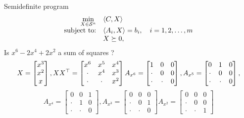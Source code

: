 \begin{frame}{Semidefinite program}
      \begin{equation*}
        \label{eq:sdp_standard}
        \begin{array}{rl}
          \min\limits_{X \in \mathcal{S}^n} & \langle C, X \rangle\\
          \text{subject to:} & \langle A_i, X \rangle = b_i, \quad i=1,2,\ldots,m\\
          & X \succeq 0,
        \end{array}
      \end{equation*}
      Is $x^6 - 2x^4 + 2x^2$ a sum of squares ?
      $$
      X =
      \begin{bmatrix}
        x^3\\
        x^2\\
        x
      \end{bmatrix},
      XX^\top =
      \begin{bmatrix}
        x^6 & x^5 & x^4\\
        \cdot & x^4 & x^3\\
        \cdot & \cdot & x^2
      \end{bmatrix}
      A_{x^6} =
      \begin{bmatrix}
        1 & 0 & 0\\
        \cdot & 0 & 0\\
        \cdot & \cdot & 0
      \end{bmatrix},
      A_{x^5} =
      \begin{bmatrix}
        0 & 1 & 0\\
        \cdot & 0 & 0\\
        \cdot & \cdot & 0
      \end{bmatrix},
      $$
      $$
      A_{x^4} =
      \begin{bmatrix}
        0 & 0 & 1\\
        \cdot & 1 & 0\\
        \cdot & \cdot & 0
      \end{bmatrix},
      A_{x^3} =
      \begin{bmatrix}
        0 & 0 & 0\\
        \cdot & 0 & 1\\
        \cdot & \cdot & 0
      \end{bmatrix}
      A_{x^2} =
      \begin{bmatrix}
        0 & 0 & 0\\
        \cdot & 0 & 0\\
        \cdot & \cdot & 1
      \end{bmatrix}
      $$

\end{frame}


